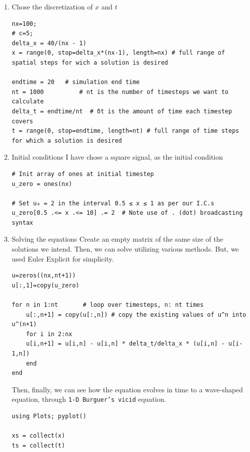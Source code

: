 \documentclass[11pt]{article}
\begin{document}
\begin{enumerate}
\item Chose the discretization of \(x\) and \(t\)
\label{sec:orgc95adff}
\begin{verbatim}
nx=100;
# c=5;
delta_x = 40/(nx - 1)
x = range(0, stop=delta_x*(nx-1), length=nx) # full range of spatial steps for wich a solution is desired

endtime = 20   # simulation end time
nt = 1000          # nt is the number of timesteps we want to calculate
delta_t = endtime/nt  # δt is the amount of time each timestep covers
t = range(0, stop=endtime, length=nt) # full range of time steps for which a solution is desired
\end{verbatim}

\item Initial conditions
\label{sec:org6ef4665}
I have chose a square signal, as the initial condition
\begin{verbatim}
# Init array of ones at initial timestep
u_zero = ones(nx)

# Set u₀ = 2 in the interval 0.5 ≤ x ≤ 1 as per our I.C.s
u_zero[0.5 .<= x .<= 10] .= 2  # Note use of . (dot) broadcasting syntax
\end{verbatim}

\item Solving the equations
\label{sec:orgfc96bd8}
Create an empty matrix of the same size of the solutions we
intend. Then, we can solve utilizing various methods. But, we used
Euler Explicit for simplicity. 

\begin{verbatim}
u=zeros((nx,nt+1))
u[:,1]=copy(u_zero)

for n in 1:nt       # loop over timesteps, n: nt times
    u[:,n+1] = copy(u[:,n]) # copy the existing values of u^n into u^(n+1)
    for i in 2:nx 
	u[i,n+1] = u[i,n] - u[i,n] * delta_t/delta_x * (u[i,n] - u[i-1,n])
    end
end
\end{verbatim}

Then, finally, we can see how the equation evolves in time to a
wave-shaped equation, through \texttt{1-D Burguer's vicid} equation.
\begin{verbatim}
using Plots; pyplot()

xs = collect(x)
ts = collect(t)


\end{verbatim}
\end{enumerate}
\end{document}
